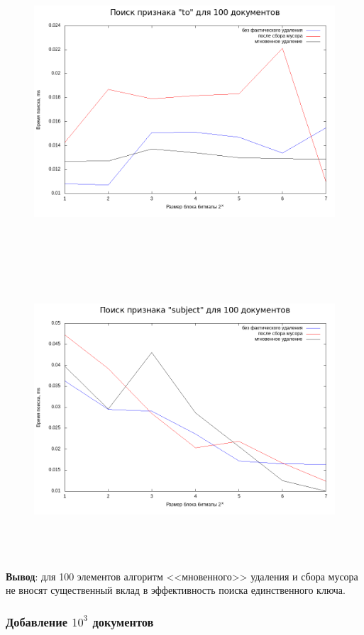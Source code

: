 \begin{figure}[H]
\includegraphics[width=\linewidth, height=11cm]{fig/limit_1/1e2/to_time.png}
\includegraphics[width=\linewidth, height=11cm]{fig/limit_1/1e2/subject_time.png}
\end{figure}

\textbf{Вывод}: для 100 элементов алгоритм <<мновенного>> удаления и сбора мусора
не вносят существенный вклад в эффективность поиска единственного ключа.

\subsubsection{Добавление $10^3$ документов}


